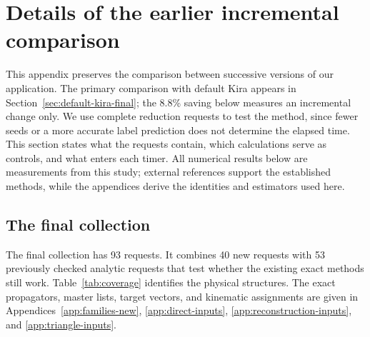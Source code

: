 \section{Details of the earlier incremental comparison}
\label{app:latest-design}
This appendix preserves the comparison between successive versions of our application. The primary comparison with default Kira appears in Section~\ref{sec:default-kira-final}; the 8.8\% saving below measures an incremental change only.
We use complete reduction requests to test the method, since fewer seeds or a more accurate label prediction does not determine the elapsed time. This section states what the requests contain, which calculations serve as controls, and what enters each timer. All numerical results below are measurements from this study; external references support the established methods, while the appendices derive the identities and estimators used here.

\subsection{The final collection}
The final collection has 93 requests. It combines 40 new requests with 53 previously checked analytic requests that test whether the existing exact methods still work. Table~\ref{tab:coverage} identifies the physical structures. The exact propagators, master lists, target vectors, and kinematic assignments are given in Appendices~\ref{app:families-new}, \ref{app:direct-inputs}, \ref{app:reconstruction-inputs}, and \ref{app:triangle-inputs}.

